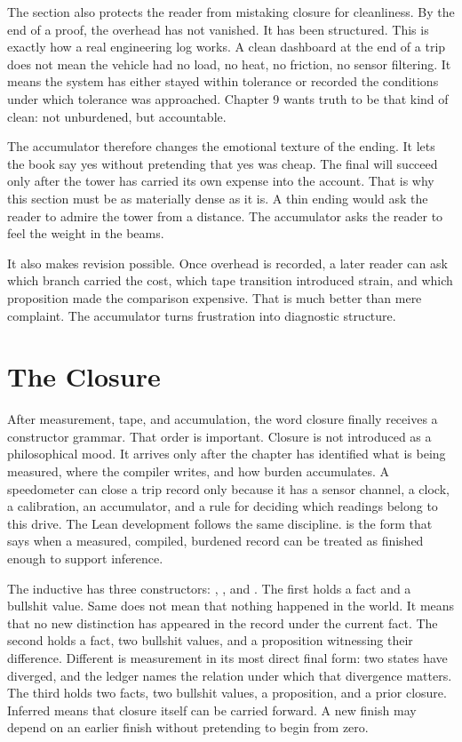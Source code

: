 The section also protects the reader from mistaking closure for cleanliness.
By the end of a proof, the overhead has not vanished. It has been structured.
This is exactly how a real engineering log works. A clean dashboard at the
end of a trip does not mean the vehicle had no load, no heat, no friction, no
sensor filtering. It means the system has either stayed within tolerance or
recorded the conditions under which tolerance was approached. Chapter 9 wants
truth to be that kind of clean: not unburdened, but accountable.

The accumulator therefore changes the emotional texture of the ending. It
lets the book say yes without pretending that yes was cheap. The final
 will succeed only after the tower has carried its own expense
into the account. That is why this section must be as materially dense as it
is. A thin ending would ask the reader to admire the tower from a distance.
The accumulator asks the reader to feel the weight in the beams.

It also makes revision possible. Once overhead is recorded, a later reader can
ask which branch carried the cost, which tape transition introduced strain,
and which proposition made the comparison expensive. That is much better than
mere complaint. The accumulator turns frustration into diagnostic structure.

\section{The Closure}
\label{se:the-closure-formal}

After measurement, tape, and accumulation, the word closure finally receives a
constructor grammar. That order is important. Closure is not introduced as a
philosophical mood. It arrives only after the chapter has identified what is
being measured, where the compiler writes, and how burden accumulates. A
speedometer can close a trip record only because it has a sensor channel, a
clock, a calibration, an accumulator, and a rule for deciding which readings
belong to this drive. The Lean development follows the same discipline.
 is the form that says when a measured, compiled, burdened
record can be treated as finished enough to support inference.

The inductive has three constructors: , , and
. The first holds a fact and a bullshit value. Same does not
mean that nothing happened in the world. It means that no new distinction has
appeared in the record under the current fact. The second holds a fact, two
bullshit values, and a proposition witnessing their difference. Different is
measurement in its most direct final form: two states have diverged, and the
ledger names the relation under which that divergence matters. The third holds
two facts, two bullshit values, a proposition, and a prior closure. Inferred
means that closure itself can be carried forward. A new finish may depend on
an earlier finish without pretending to begin from zero.

